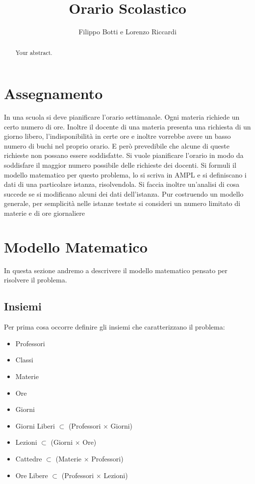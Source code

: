 \documentclass{article}
\title{Orario Scolastico}
\author{Filippo Botti e Lorenzo Riccardi}
\begin{document}
\maketitle

\begin{abstract}
Your abstract.
\end{abstract}

\section{Assegnamento}
In una scuola si deve pianificare l’orario settimanale. Ogni materia richiede un
certo numero di ore. Inoltre il docente di una materia presenta una richiesta di
un giorno libero, l’indisponibilità in certe ore e inoltre vorrebbe avere un basso
numero di buchi nel proprio orario. E però prevedibile che alcune di queste
richieste non possano essere soddisfatte. Si vuole pianificare l’orario in modo da
soddisfare il maggior numero possibile delle richieste dei docenti.
Si formuli il modello matematico per questo problema, lo si scriva in AMPL
e si definiscano i dati di una particolare istanza, risolvendola. Si faccia inoltre
un’analisi di cosa succede se si modificano alcuni dei dati dell’istanza. Pur
costruendo un modello generale, per semplicità nelle istanze testate si consideri
un numero limitato di materie e di ore giornaliere

\section{Modello Matematico}
In questa sezione andremo a descrivere il modello matematico pensato per risolvere il problema. 
\subsection{Insiemi}
Per prima cosa occorre definire gli insiemi che caratterizzano il problema:
\begin{itemize}
    \item Professori
    \item Classi
    \item Materie
    \item Ore
    \item Giorni
    \item Giorni Liberi $\subset$ (Professori $\times$ Giorni)
    \item Lezioni $\subset$ (Giorni $\times$ Ore)
    \item Cattedre $\subset$ (Materie $\times$ Professori)
    \item Ore Libere $\subset$ (Professori $\times$ Lezioni)
\end{itemize}
\end{document}
